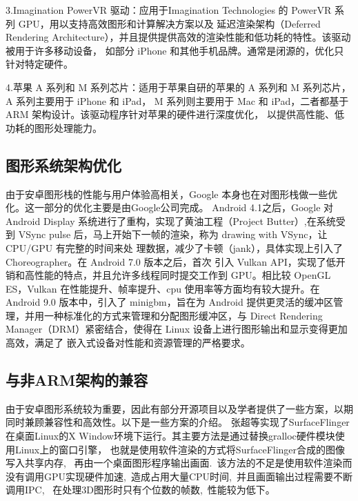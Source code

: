 3.Imagination PowerVR 驱动：应用于Imagination Technologies 的 PowerVR 系列 GPU，用以支持高效图形和计算解决方案以及
延迟渲染架构（Deferred Rendering Architecture），并且提供提供高效的渲染性能和低功耗的特性。该驱动被用于许多移动设备，
如部分 iPhone 和其他手机品牌。通常是闭源的，优化只针对特定硬件。

4.苹果 A 系列和 M 系列芯片：适用于苹果自研的苹果的 A 系列和 M 系列芯片，A 系列主要用于 iPhone 和 iPad，
M 系列则主要用于 Mac 和 iPad，二者都基于 ARM 架构设计。该驱动程序针对苹果的硬件进行深度优化，
以提供高性能、低功耗的图形处理能力。




\subsection{图形系统架构优化}
由于安卓图形栈的性能与用户体验高相关，Google 本身也在对图形栈做一些优化。这一部分的优化主要是由Google公司完成。
Android 4.1之后，Google 对 Android Display 系统进行了重构，实现了黄油工程（Project Butter）,在系统受到
VSync pulse 后，马上开始下一帧的渲染，称为 drawing with VSync，让 CPU/GPU 有完整的时间来处
理数据，减少了卡顿（jank），具体实现上引入了 Choreographer\cite{}。在 Android 7.0 版本之后，首次
引入 Vulkan API，实现了低开销和高性能的特点，并且允许多线程同时提交工作到 GPU。相比较
OpenGL ES，Vulkan 在性能提升、帧率提升、cpu 使用率等方面均有较大提升。在Android 9.0 版本中，引入了
minigbm，旨在为 Android 提供更灵活的缓冲区管理，并用一种标准化的方式来管理和分配图形缓冲区，与 
Direct Rendering Manager（DRM）紧密结合，使得在 Linux 设备上进行图形输出和显示变得更加高效，满足了
嵌入式设备对性能和资源管理的严格要求。

\subsection{与非ARM架构的兼容}
由于安卓图形系统较为重要，因此有部分开源项目以及学者提供了一些方案，以期同时兼顾兼容性和高效性。以下是一些方案的介绍。
张超等\cite{张超2012Android}实现了SurfaceFlinger在桌面Linux的X Window环境下运行。其主要方法是通过替换gralloc硬件模块使用Linux上的窗口引擎，
也就是使用软件渲染的方式将SurfaceFlinger合成的图像写入共享内存,
 再由一个桌面图形程序输出画面. 该方法的不足是使用软件渲染而没有调用GPU实现硬件加速, 造成占用大量CPU时间, 并且画面输出过程需要不断调用IPC,
 在处理3D图形时只有个位数的帧数, 性能较为低下。

